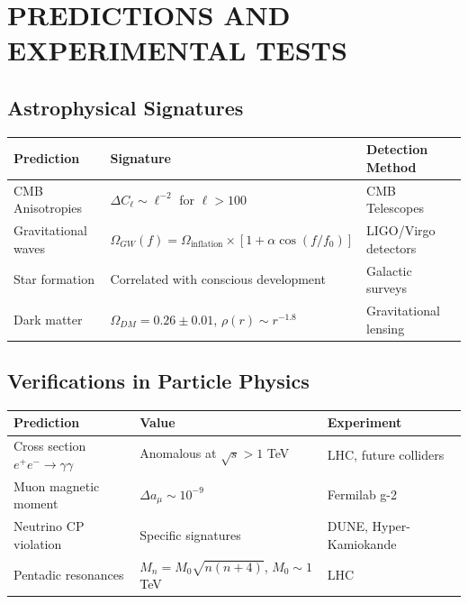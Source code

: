 \documentclass[11pt]{article}
\begin{document}
\hypertarget{predictions-and-experimental-tests}{%
\section{PREDICTIONS AND EXPERIMENTAL
TESTS}\label{predictions-and-experimental-tests}}

\hypertarget{astrophysical-signatures}{%
\subsection{Astrophysical Signatures}\label{astrophysical-signatures}}

\begin{longtable}{@{}lll@{}}
\toprule
\textbf{Prediction} & \textbf{Signature} & \textbf{Detection Method} \\
\midrule
CMB Anisotropies & $\Delta C_\ell \sim \ell^{-2}$ for $\ell > 100$ & CMB Telescopes \\
Gravitational waves & $\Omega_{GW}(f) = \Omega_{\text{inflation}} \times [1 + \alpha \cos(f/f_0)]$ & LIGO/Virgo detectors \\
Star formation & Correlated with conscious development & Galactic surveys \\
Dark matter & $\Omega_{DM} = 0.26 \pm 0.01$, $\rho(r) \sim r^{-1.8}$ & Gravitational lensing \\
\bottomrule
\end{longtable}

\hypertarget{verifications-in-particle-physics}{%
\subsection{Verifications in Particle
Physics}\label{verifications-in-particle-physics}}

\begin{longtable}{@{}lll@{}}
\toprule
\textbf{Prediction} & \textbf{Value} & \textbf{Experiment} \\
\midrule
Cross section $e^+e^- \rightarrow \gamma\gamma$ & Anomalous at $\sqrt{s} > 1$ TeV & LHC, future colliders \\
Muon magnetic moment & $\Delta a_\mu \sim 10^{-9}$ & Fermilab g-2 \\
Neutrino CP violation & Specific signatures & DUNE, Hyper-Kamiokande \\
Pentadic resonances & $M_n = M_0\sqrt{n(n+4)}$, $M_0 \sim 1$ TeV & LHC \\
\bottomrule
\end{longtable}
\end{document}
